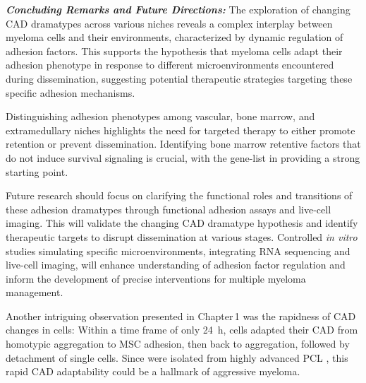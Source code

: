 \textbf{\textit{Concluding Remarks and Future Directions:}} The exploration of
changing \ac{CAD} dramatypes across various niches reveals a complex interplay
between myeloma cells and their environments, characterized by dynamic
regulation of adhesion factors. This supports the hypothesis that myeloma cells
adapt their adhesion phenotype in response to different microenvironments
encountered during dissemination, suggesting potential therapeutic strategies
targeting these specific adhesion mechanisms.

Distinguishing adhesion phenotypes among vascular, bone marrow, and
extramedullary niches highlights the need for targeted therapy to either promote
retention or prevent dissemination. Identifying bone marrow retentive factors
that do not induce survival signaling is crucial, with the gene-list in
 providing a strong starting point.

Future research should focus on clarifying the functional roles and transitions
of these adhesion dramatypes through functional adhesion assays and live-cell
imaging. This will validate the changing \ac{CAD} dramatype hypothesis and
identify therapeutic targets to disrupt dissemination at various stages.
Controlled \textit{in vitro} studies simulating specific microenvironments,
integrating RNA sequencing and live-cell imaging, will enhance understanding of
adhesion factor regulation and inform the development of precise interventions
for multiple myeloma management.




\unnsubsection{\cadplasticitytitle}%
\label{sec:discussion_caddadaptability}%
Another intriguing observation presented in Chapter\,1 was the rapidness of 
\ac{CAD} changes in \INA cells: Within a time frame of only \SI{24}{\hour},
\INA cells adapted their \ac{CAD} from homotypic aggregation to \ac{MSC}
adhesion, then back to aggregation, followed by detachment of single cells.
Since \INA were isolated from highly advanced \ac{PCL}
\cite{burgerGp130RasMediated2001}, this rapid \ac{CAD} adaptability could be a
hallmark of aggressive myeloma.




